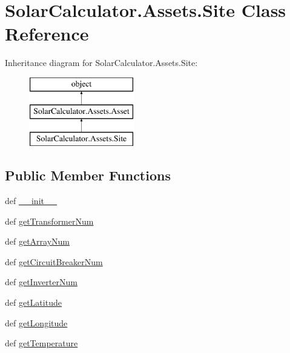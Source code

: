 \hypertarget{class_solar_calculator_1_1_assets_1_1_site}{\section{Solar\-Calculator.\-Assets.\-Site Class Reference}
\label{class_solar_calculator_1_1_assets_1_1_site}
}
Inheritance diagram for Solar\-Calculator.\-Assets.\-Site\-:\begin{figure}[H]
\begin{center}
\leavevmode
\includegraphics[height=3.000000cm]{class_solar_calculator_1_1_assets_1_1_site}
\end{center}
\end{figure}
\subsection*{Public Member Functions}
\begin{DoxyCompactItemize}
\item 
def \hyperlink{class_solar_calculator_1_1_assets_1_1_site_ac73e3116ee8e8ba82722bfbeec366220}{\-\_\-\-\_\-init\-\_\-\-\_\-}
\item 
def \hyperlink{class_solar_calculator_1_1_assets_1_1_site_a7b6862a2f5faeeef31a56b8394b17088}{get\-Transformer\-Num}
\item 
def \hyperlink{class_solar_calculator_1_1_assets_1_1_site_ac8939f3e3726a61515a59819866bfce3}{get\-Array\-Num}
\item 
def \hyperlink{class_solar_calculator_1_1_assets_1_1_site_a0d359d2dc4c19a061c42482c504608eb}{get\-Circuit\-Breaker\-Num}
\item 
def \hyperlink{class_solar_calculator_1_1_assets_1_1_site_ab27ce9e45f22fcc658f92c831d9fc708}{get\-Inverter\-Num}
\item 
def \hyperlink{class_solar_calculator_1_1_assets_1_1_site_a9aee0f7155c7bfdf5b0b8c1e730a4fbe}{get\-Latitude}
\item 
def \hyperlink{class_solar_calculator_1_1_assets_1_1_site_a8e3fca7efa946f9ede5d1e4562762f0a}{get\-Longitude}
\item 
def \hyperlink{class_solar_calculator_1_1_assets_1_1_site_a3f7284476bb7a835e0fe8e708eb6952b}{get\-Temperature}
\end{DoxyCompactItemize}
